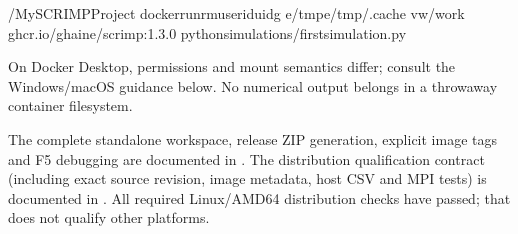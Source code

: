 \documentclass[letterpaper,10pt,english]{sphinxmanual}
\begin{document}
\begin{enumerate}
\begin{sphinxVerbatim}[commandchars=\\\{\}]
\PYGZti{}/MySCRIMPProject
dockerrun\PYGZhy{}\PYGZhy{}rm\PYGZhy{}\PYGZhy{}userid\PYGZhy{}uid\PYGZhy{}g
\PYGZhy{}e/tmp\PYGZhy{}e/tmp/.cache
\PYGZhy{}v\PYGZhy{}w/work
ghcr.io/g\PYGZhy{}haine/scrimp:1.3.0
pythonsimulations/first\PYGZus{}simulation.py
\end{sphinxVerbatim}

\sphinxAtStartPar
On Docker Desktop, permissions and mount semantics differ; consult
the Windows/macOS guidance below. No numerical output belongs
in a throwaway container filesystem.

\end{enumerate}

\sphinxAtStartPar
The complete standalone workspace, release ZIP generation, explicit
image tags and F5 debugging are documented in {\hyperref[\detokenize{vscode::doc}]{}}.
The distribution qualification contract (including exact source
revision, image metadata, host CSV and MPI tests) is documented
in . All required
Linux/AMD64 distribution checks have passed; that does not
qualify other platforms.
\end{document}
